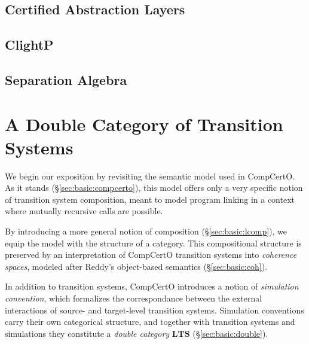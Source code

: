 \documentclass[acmsmall,screen,review,anonymous]{acmart}
\begin{document}

\subsection{Certified Abstraction Layers}
\subsection{ClightP}
\subsection{Separation Algebra}


\section{A Double Category of Transition Systems} \label{sec:base} %


We begin our exposition by revisiting
the semantic model used in CompCertO.
As it stands (\S\ref{sec:basic:compcerto}),
this model offers only a very specific notion
of transition system composition,
meant to model program linking
in a context where
mutually recursive calls are possible.

By introducing a more general notion of composition (\S\ref{sec:basic:lcomp}),
we equip the model with the structure of a category.
This compositional structure
is preserved by an interpretation of CompCertO transition systems
into \emph{coherence spaces},
modeled after Reddy's object-based semantics (\S\ref{sec:basic:coh}).

In addition to transition systems,
CompCertO introduces a notion of \emph{simulation convention},
which formalizes the correspondance between the external interactions
of source- and target-level transition systems.
Simulation conventions carry their own categorical structure,
and together with transition systems and simulations
they constitute
a \emph{double category} $\mathbf{LTS}$ (\S\ref{sec:basic:double}).
\end{document}
